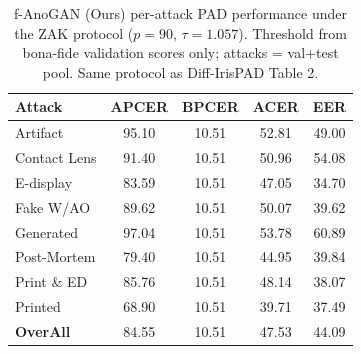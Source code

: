 \begin{table}[t]
\centering
\small
\caption{f-AnoGAN (Ours) per-attack PAD performance under the ZAK protocol ($p{=}90$, $\tau{=}1.057$). Threshold from bona-fide validation scores only; attacks = val+test pool. Same protocol as Diff-IrisPAD Table 2.}
\label{tab:fanogan_zak}
\begin{tabular}{lcccc}
\toprule
Attack & APCER & BPCER & ACER & EER \\
\midrule
Artifact & 95.10 & 10.51 & 52.81 & 49.00 \\
Contact Lens & 91.40 & 10.51 & 50.96 & 54.08 \\
E-display & 83.59 & 10.51 & 47.05 & 34.70 \\
Fake W/AO & 89.62 & 10.51 & 50.07 & 39.62 \\
Generated & 97.04 & 10.51 & 53.78 & 60.89 \\
Post-Mortem & 79.40 & 10.51 & 44.95 & 39.84 \\
Print \& ED & 85.76 & 10.51 & 48.14 & 38.07 \\
Printed & 68.90 & 10.51 & 39.71 & 37.49 \\
\midrule
\textbf{OverAll} & 84.55 & 10.51 & 47.53 & 44.09 \\
\bottomrule
\end{tabular}
\end{table}